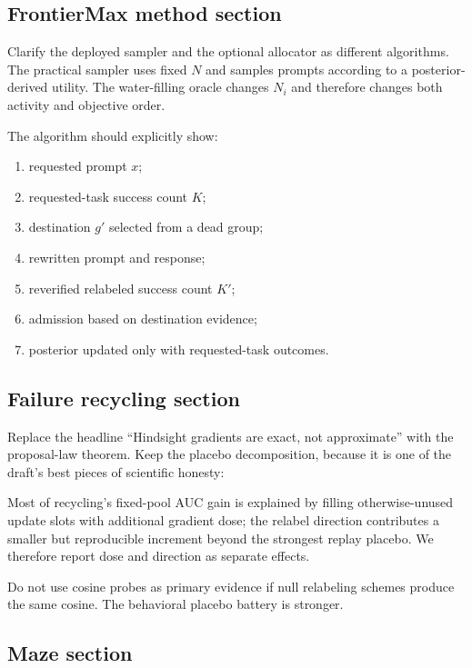 \documentclass[11pt]{article}
\theoremstyle{definition}
\theoremstyle{remark}
\begin{document}
\subsection{FrontierMax method section}

Clarify the deployed sampler and the optional allocator as different algorithms. The practical sampler uses fixed $N$ and samples prompts according to a posterior-derived utility. The water-filling oracle changes $N_i$ and therefore changes both activity and objective order.

The algorithm should explicitly show:

\begin{enumerate}[leftmargin=2em]
\item requested prompt $x$;
\item requested-task success count $K$;
\item destination $g'$ selected from a dead group;
\item rewritten prompt and response;
\item reverified relabeled success count $K'$;
\item admission based on destination evidence;
\item posterior updated only with requested-task outcomes.
\end{enumerate}

\subsection{Failure recycling section}

Replace the headline ``Hindsight gradients are exact, not approximate'' with the proposal-law theorem. Keep the placebo decomposition, because it is one of the draft's best pieces of scientific honesty:

\begin{rewritebox}
Most of recycling's fixed-pool AUC gain is explained by filling otherwise-unused update slots with additional gradient dose; the relabel direction contributes a smaller but reproducible increment beyond the strongest replay placebo. We therefore report dose and direction as separate effects.
\end{rewritebox}

Do not use cosine probes as primary evidence if null relabeling schemes produce the same cosine. The behavioral placebo battery is stronger.

\subsection{Maze section}
\end{document}
